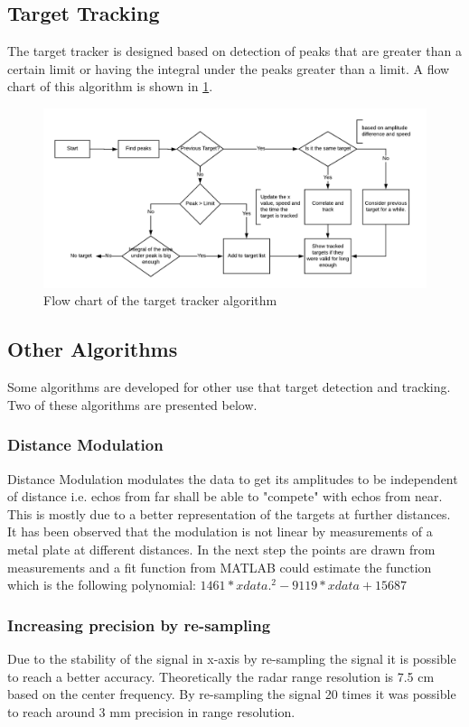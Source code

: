 \subsection{Target Tracking}
The target tracker is designed based on detection of peaks that are greater than a certain limit or having the integral under the peaks greater than a limit. A flow chart of this algorithm is shown in \ref{fig:FlowChart}.
\begin{figure}
    \centering
    \includegraphics[width=10 cm]{Figures/BlankDiagram.PNG}
    \caption{Flow chart of the target tracker algorithm}
    \label{fig:FlowChart}
\end{figure}
\subsection{Other Algorithms}
Some algorithms are developed for other use that target detection and tracking. Two of these algorithms are presented below.
\subsubsection{Distance Modulation}
Distance Modulation  modulates the data to get its amplitudes to be independent of distance i.e. echos from far shall be able to "compete" with echos from near. This is mostly due to a better representation of the targets at further distances. It has been observed that the modulation is not linear by measurements of a metal plate at different distances. In the next step the points are drawn from measurements and a fit function from MATLAB could estimate the function which is the following polynomial:
$1461 * xdata .^2 - 9119 * xdata + 15687$ 
\subsubsection{Increasing precision by re-sampling}
Due to the stability of the signal in x-axis by re-sampling the signal it is possible to reach a better accuracy. Theoretically the radar range resolution is 7.5 cm based on the center frequency. By re-sampling the signal 20 times it was possible to reach around 3 mm precision in range resolution.  
